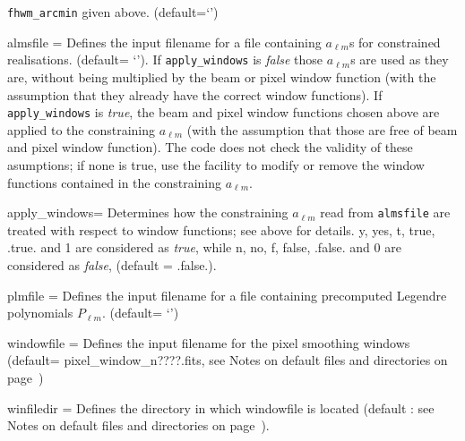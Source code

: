 \begin{qualifiers}
\begin{qulistwide}{}
    {\tt fhwm\_arcmin} given above. (default=`')
%
     \item[{almsfile = }]%
 Defines the input filename for a file
    containing $a_{\ell m}$s for constrained realisations. 
(default= `'). If {\tt apply\_windows} is {\em false} 
those $a_{\ell m}$s are used as they are, without being multiplied
by the beam or pixel window function (with the assumption that they already have the
    correct window functions). If {\tt apply\_windows} is {\em true}, the beam and
    pixel window functions chosen above are applied to the constraining $a_{\ell m}$ (with the
    assumption that those are free of beam and pixel window function). The code
    does not check the validity of these asumptions; if none is true, use the
     facility to modify or remove
    the window functions contained in the constraining $a_{\ell m}$.
%
     \item[{apply\_windows=}] Determines how the constraining $a_{\ell m}$  read from
     {\tt almsfile} are
     treated with respect to window functions; see above for details. 
     y, yes, t, true, .true. and 1 are considered as {\em true}, while n, no, f,
     false, .false. and 0 are considered as {\em false}, (default = .false.).
%
     \item[{plmfile = }]%
 Defines the input  filename for a file
    containing  precomputed Legendre polynomials $P_{\ell m}$.
(default= `')
     \item[{windowfile = }]%
 Defines the input filename  for the pixel
    smoothing windows 
(default= pixel\_window\_n????.fits, see Notes on default files and directories on page~\pageref{page:defdir})
     \item[{winfiledir = }] Defines the directory in which windowfile
    is located (default : see Notes on default files and directories on page~\pageref{page:defdir}).
  \end{qulistwide}
\end{qualifiers}


